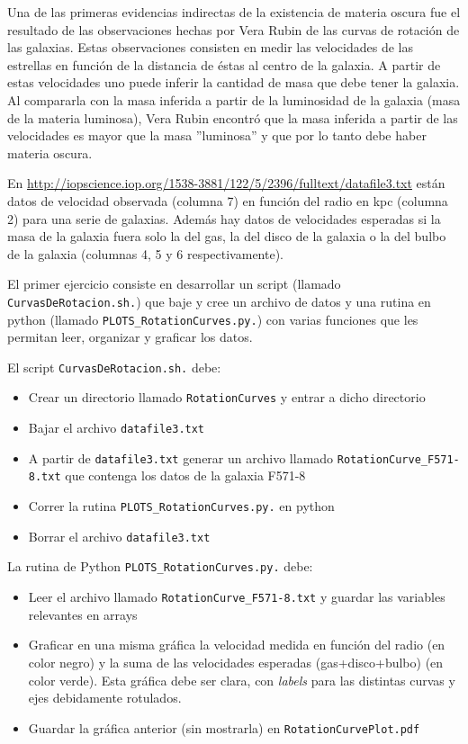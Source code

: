 \documentclass[11pt,letterpaper]{exam}
\begin{document}
\begin{questions}


Una de las primeras evidencias indirectas de la existencia de materia oscura fue el resultado de las observaciones hechas por Vera Rubin de las curvas de rotación de las galaxias. Estas observaciones consisten en medir las velocidades de las estrellas en función de la distancia de éstas al centro de la galaxia. A partir de estas velocidades uno puede inferir la cantidad de masa que debe tener la galaxia. Al compararla con la masa inferida a partir de la luminosidad de la galaxia (masa de la materia luminosa), Vera Rubin encontró que la masa inferida a partir de las velocidades es mayor que la masa ''luminosa'' y que por lo tanto debe haber materia oscura. 

En \url{http://iopscience.iop.org/1538-3881/122/5/2396/fulltext/datafile3.txt} están datos de velocidad observada (columna 7) en función del radio en kpc (columna 2) para una serie de galaxias. Además hay datos de velocidades esperadas si la masa de la galaxia fuera solo la del gas, la del disco de la galaxia o la del bulbo de la galaxia (columnas 4, 5 y 6 respectivamente).  

El primer ejercicio consiste en desarrollar un script (llamado \verb"CurvasDeRotacion.sh.") que baje y cree un archivo de datos y una rutina en python (llamado \verb"PLOTS_RotationCurves.py.") con varias funciones que les permitan leer, organizar y graficar los datos.

El script  \verb"CurvasDeRotacion.sh." debe:
\begin{itemize}
\item{Crear un directorio llamado \verb"RotationCurves" y entrar a dicho directorio}
\item{Bajar el archivo \verb"datafile3.txt"}
\item{A partir de \verb"datafile3.txt" generar un archivo llamado \verb"RotationCurve_F571-8.txt" que contenga los datos de la galaxia F571-8} 
\item{Correr la rutina \verb"PLOTS_RotationCurves.py." en python} 
\item{Borrar el archivo \verb"datafile3.txt"} 
\end{itemize}

La rutina de Python \verb"PLOTS_RotationCurves.py." debe:
\begin{itemize}
\item{Leer el archivo llamado \verb"RotationCurve_F571-8.txt" y guardar las variables relevantes en arrays}
\item{Graficar en una misma gráfica la velocidad medida en función del radio (en color negro) y la suma de las velocidades esperadas (gas+disco+bulbo) (en color verde). 
Esta gráfica debe ser clara, con \emph{labels} para las distintas curvas y ejes debidamente rotulados.}
\item{Guardar la gráfica anterior (sin mostrarla) en \verb"RotationCurvePlot.pdf"}
\end{itemize}


\end{questions}
\end{document}
